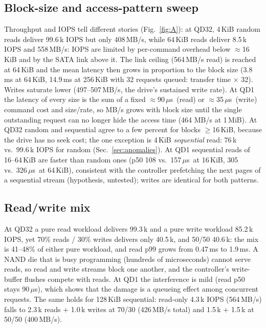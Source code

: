 ﻿\documentclass[10.5pt]{article}
\newcommand{\us}{\,$\mu$s}
\begin{document}
\subsection{Block-size and access-pattern sweep}
\begin{table}[H]\centering\small
\caption{Block sizes 4\,KiB--256\,KiB for random and sequential access, plus 512\,KiB and 1\,MiB for sequential only; medians of 3 trials. Throughput and latency come from the same runs at QD=1 and QD=32.}\label{tab:bs}\end{table}
Throughput and IOPS tell different stories (Fig.~\ref{fig:A}): at QD32, 4\,KiB random reads deliver 99.6\,k IOPS but only 408\,MB/s, while 64\,KiB reads deliver 8.5\,k IOPS and 558\,MB/s: IOPS are limited by per-command overhead below $\approx$16\,KiB and by the SATA link above it. The link ceiling (564\,MB/s read) is reached at 64\,KiB and the mean latency then grows in proportion to the block size (3.8\,ms at 64\,KiB, 14.9\,ms at 256\,KiB with 32 requests queued: transfer time $\times$ 32). Writes saturate lower (497--507\,MB/s, the drive's sustained write rate). At QD1 the latency of every size is the sum of a fixed $\approx$90\us\ (read) or $\approx$35\us\ (write) command cost and size/rate, so MB/s grows with block size until the single outstanding request can no longer hide the access time (464 MB/s at 1\,MiB). At QD32 random and sequential agree to a few percent for blocks $\ge$16\,KiB, because the drive has no seek cost; the one exception is 4\,KiB \emph{sequential} read: 76\,k vs.\ 99.6\,k IOPS for random (Sec.~\ref{sec:anomalies}). At QD1 sequential reads of 16--64\,KiB are faster than random ones (p50 108 vs.\ 157\us\ at 16\,KiB, 305 vs.\ 326\us\ at 64\,KiB), consistent with the controller prefetching the next pages of a sequential stream (hypothesis, untested); writes are identical for both patterns.

\subsection{Read/write mix}
\begin{table}[H]\centering\small
\caption{4\,KiB random, fixed range; IOPS and MB/s are totals (read+write); latencies per direction.}\label{tab:mix}\end{table}
At QD32 a pure read workload delivers 99.3\,k and a pure write workload 85.2\,k IOPS, yet 70\% reads / 30\% writes delivers only 40.5\,k, and 50/50 40.6\,k: the mix is 41--48\% of either pure workload, and read p99 grows from 0.47\,ms to 1.9\,ms. A NAND die that is busy programming (hundreds of microseconds) cannot serve reads, so read and write streams block one another, and the controller's write-buffer flushes compete with reads. At QD1 the interference is mild (read p50 stays 90\us), which shows that the damage is a queueing effect among concurrent requests. The same holds for 128\,KiB sequential: read-only 4.3\,k IOPS (564\,MB/s) falls to 2.3\,k reads + 1.0\,k writes at 70/30 (426\,MB/s total) and 1.5\,k + 1.5\,k at 50/50 (400\,MB/s).
\end{document}
